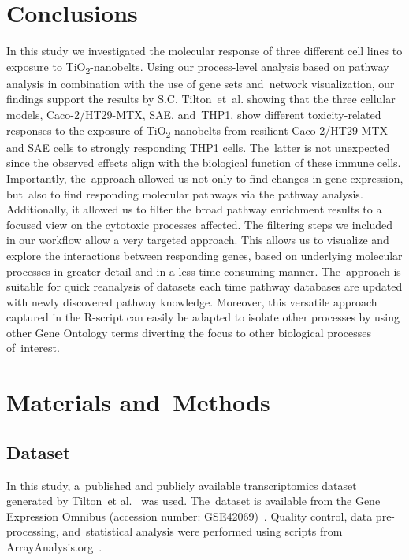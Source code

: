 \documentclass[ijms,article,accept,moreauthors,pdftex]{Definitions/mdpi}
\begin{document}
\begin{paracol}{2}
\section{Conclusions}
In this study we investigated the molecular response of three different cell lines to exposure to TiO\textsubscript{2}-nanobelts. Using our process-level analysis based on pathway analysis {in combination with the use of} gene sets and~network visualization, our findings support the results by S.C. Tilton~et~al. showing that the three {cellular models, Caco-2/HT29-MTX}, SAE, and~THP1, show different toxicity-related responses to the exposure of TiO\textsubscript{2}-nanobelts from resilient {Caco-2/HT29-MTX} and SAE cells to strongly responding THP1 cells. The~latter is not unexpected since the observed effects align with the biological function of these immune cells. Importantly, the~approach allowed us not {only} to find changes in gene expression, but~also to find responding molecular pathways via the pathway analysis. Additionally, {it} allowed us to filter the broad pathway enrichment results to a focused view on the cytotoxic processes affected. {The filtering steps we included in our workflow allow a very targeted approach.} This allows us to visualize and explore the interactions between responding genes, based on underlying molecular processes {in greater detail and in a less time-consuming manner.  The~approach is suitable for quick reanalysis of datasets each time pathway databases are updated with newly discovered pathway knowledge. Moreover,} this versatile approach captured in the R-script can easily be adapted to isolate other processes by using other Gene Ontology terms diverting the focus to other biological processes of~interest.
\section{Materials and~Methods}
\unskip

\subsection{Dataset}
In this study, a~published and publicly available transcriptomics dataset generated by Tilton~{et al.}~\cite{Tilton2013} was used. The~dataset is available from the Gene Expression Omnibus (accession number: GSE42069)~\cite{Edgar2002}. Quality control, data pre-processing, and~statistical analysis were performed using scripts from ArrayAnalysis.org~\cite{Eijssen2013}. 


\end{paracol}
\end{document}
